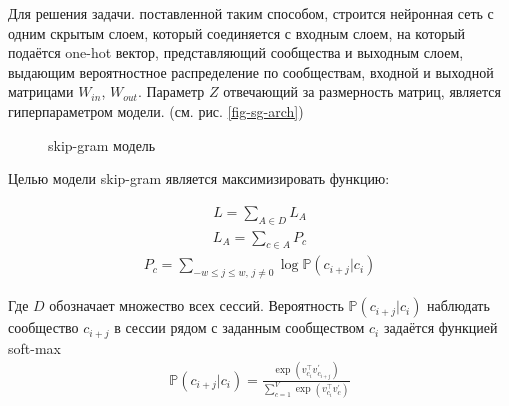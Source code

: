 \documentclass[times,specification,annotation]{itmo-student-thesis}
\begin{document}
Для решения задачи. поставленной таким способом, строится нейронная сеть с одним скрытым слоем, который соединяется с входным слоем, на который подаётся one-hot вектор, представляющий сообщества и выходным слоем, выдающим вероятностное распределение по сообществам, входной и выходной матрицами $W_{in}$, $W_{out}$. Параметр $Z$ отвечающий за размерность матриц, является гиперпараметром модели. (см. рис. \ref {fig-sg-arch})

\begin{figure}[!h]
\caption{skip-gram модель}\label{fig-sg}
\centering
{}
\end{figure}

Целью модели skip-gram является максимизировать функцию: 

\begin{align}
L = \sum_{A \in D}L_A
\label{eq1}
\end{align}
\begin{align}
L_A = \sum_{c \in A}P_c
\label{eq-a}
\end{align}
\begin{align}
P_c = \sum_{-w \leq j \leq w,\, j \ne 0}\log \mathbb{P}(c_{i + j} | c_i)  
\label{eq-opt-ses}
\end{align}

Где $D$ обозначает множество всех сессий. Вероятность $\mathbb{P}(c_{i + j} | c_i)$ наблюдать сообщество $c_{i + j}$ в сессии рядом с заданным сообществом $c_i$ задаётся функцией soft-max 
\begin{align}
\mathbb{P}(c_{i + j} | c_i) = \frac{\exp(v_{c_i}^\top v_{c_{i + j}}^{'})}{\sum_{c = 1}^{V}\exp(v_{c_i}^\top v_{c}^{'})}
\label{eq-softmax}
\end{align}
\end{document}
